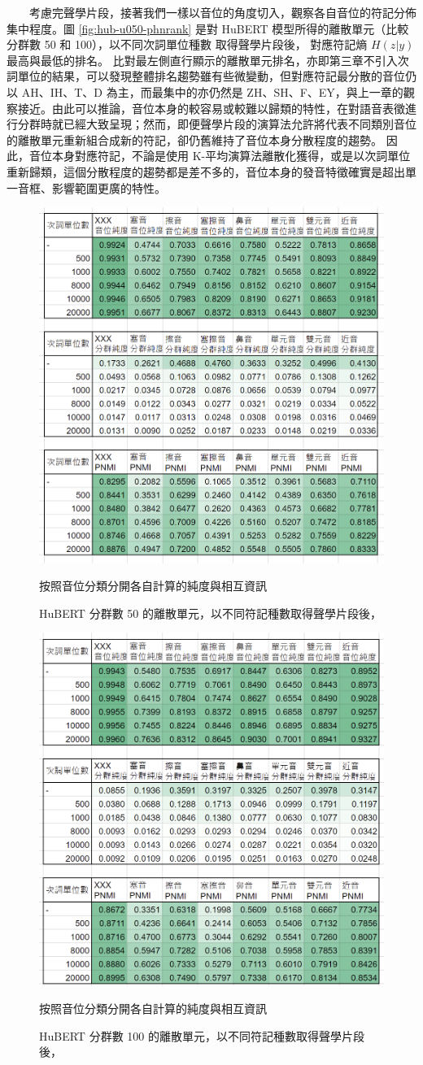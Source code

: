     
　　考慮完聲學片段，接著我們一樣以音位的角度切入，觀察各自音位的符記分佈集中程度。圖 \ref{fig:hub-u050-phnrank} 是對 HuBERT 模型所得的離散單元（比較分群數 50 和 100），以不同次詞單位種數
取得聲學片段後，
對應符記熵 $H(z|y)$ 最高與最低的排名。
比對最左側直行顯示的離散單元排名，亦即第三章不引入次詞單位的結果，可以發現整體排名趨勢雖有些微變動，但對應符記最分散的音位仍以 AH、IH、T、D 為主，而最集中的亦仍然是 ZH、SH、F、EY，與上一章的觀察接近。由此可以推論，音位本身的較容易或較難以歸類的特性，在對語音表徵進行分群時就已經大致呈現；然而，即便聲學片段的演算法允許將代表不同類別音位的離散單元重新組合成新的符記，卻仍舊維持了音位本身分散程度的趨勢。
因此，音位本身對應符記，不論是使用 K-平均演算法離散化獲得，或是以次詞單位重新歸類，這個分散程度的趨勢都是差不多的，音位本身的發音特徵確實是超出單一音框、影響範圍更廣的特性。 




{
\begin{figure}  %
    \centering
    \includegraphics[width=0.5\linewidth]{hub50-ap-detailedpur.png}
    \caption{HuBERT 分群數 50 的離散單元，以不同符記種數取得聲學片段後，}
    按照音位分類分開各自計算的純度與相互資訊
    \label{fig:hub50-ap-detailedpur}
\end{figure}
}


\begin{figure}
    \centering
    \includegraphics[width=0.5\linewidth]{hub100-ap-detailedpur.png}
     \caption{HuBERT 分群數 100 的離散單元，以不同符記種數取得聲學片段後，}
    按照音位分類分開各自計算的純度與相互資訊
    \label{fig:hub100-ap-detailedpur}
\end{figure}


